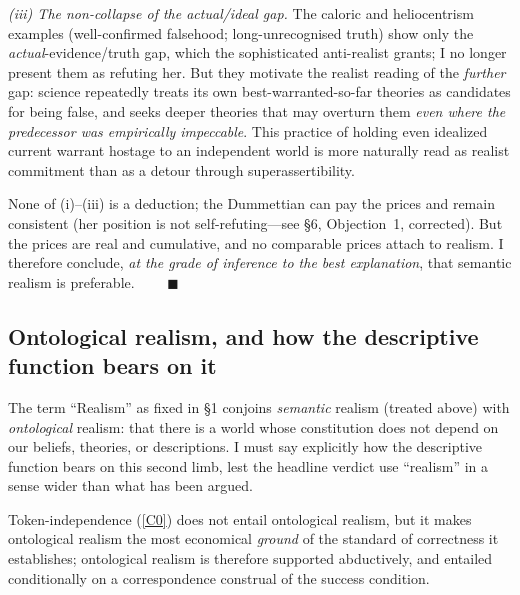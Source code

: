 \documentclass[12pt]{article}
\begin{document}
\noindent\emph{(iii) The non-collapse of the actual/ideal gap.} The
caloric and heliocentrism examples (well-confirmed falsehood; long-unrecognised
truth) show only the \emph{actual}-evidence/truth gap, which the
sophisticated anti-realist grants; I no longer present them as refuting
her. But they motivate the realist reading of the \emph{further}
gap: science repeatedly treats its own best-warranted-so-far theories as
candidates for being false, and seeks deeper theories that may overturn
them \emph{even where the predecessor was empirically impeccable}. This
practice of holding even idealized current warrant hostage to an
independent world is more naturally read as realist commitment than as a
detour through superassertibility.

\noindent None of (i)--(iii) is a deduction; the Dummettian can pay the
prices and remain consistent (her position is not self-refuting---see \S6,
Objection~1, corrected). But the prices are real and cumulative, and no
comparable prices attach to realism. I therefore conclude, \emph{at the
grade of inference to the best explanation}, that semantic realism is
preferable. $\qquad\blacksquare$

\subsection{Ontological realism, and how the descriptive function bears on it}

The term ``Realism'' as fixed in \S1 conjoins \emph{semantic} realism
(treated above) with \emph{ontological} realism: that there is a world
whose constitution does not depend on our beliefs, theories, or
descriptions. I must say explicitly how the descriptive function bears on
this second limb, lest the headline verdict use ``realism'' in a sense
wider than what has been argued.

\begin{description}[leftmargin=1.6em,style=nextline]
\item[Claim 3$''$ (Conditional and abductive support for ontological realism).]
Token-independence (\ref{C0}) does not entail ontological realism, but it
makes ontological realism the most economical \emph{ground} of the
standard of correctness it establishes; ontological realism is therefore
supported abductively, and entailed conditionally on a correspondence
construal of the success condition.
\end{description}
\end{document}
